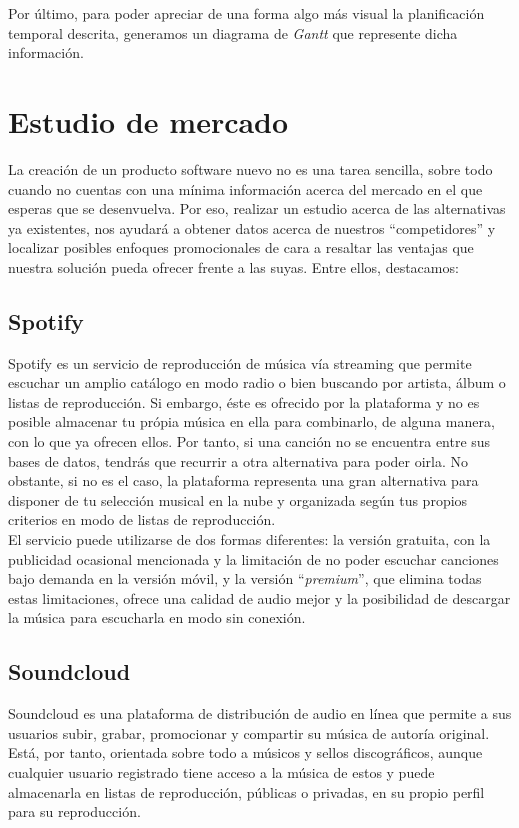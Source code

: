 Por último, para poder apreciar de una forma algo más visual la planificación temporal descrita, generamos un diagrama de \textit{Gantt} que represente dicha información.

\section{Estudio de mercado}

La creación de un producto software nuevo no es una tarea sencilla, sobre todo cuando no cuentas con una mínima información acerca del mercado en el que esperas que se desenvuelva. Por eso, realizar un estudio acerca de las alternativas ya existentes, nos ayudará a obtener datos acerca de nuestros ``competidores'' y localizar posibles enfoques promocionales de cara a resaltar las ventajas que nuestra solución pueda ofrecer frente a las suyas. Entre ellos, destacamos:

\subsection{Spotify \cite{Spotify}}
Spotify es un servicio de reproducción de música vía streaming que permite escuchar un amplio catálogo en modo radio o bien buscando por artista, álbum o listas de reproducción. Si embargo, éste es ofrecido por la plataforma y no es posible almacenar tu própia música en ella para combinarlo, de alguna manera, con lo que ya ofrecen ellos. Por tanto, si una canción no se encuentra entre sus bases de datos, tendrás que recurrir a otra alternativa para poder oirla. No obstante, si no es el caso, la plataforma representa una gran alternativa para disponer de tu selección musical en la nube y organizada según tus propios criterios en modo de listas de reproducción.\\

El servicio puede utilizarse de dos formas diferentes: la versión gratuita, con la publicidad ocasional mencionada y la limitación de no poder escuchar canciones bajo demanda en la versión móvil, y la versión ``\textit{premium}'', que elimina todas estas limitaciones, ofrece una calidad de audio mejor y la posibilidad de descargar la música para escucharla en modo sin conexión.

\subsection{Soundcloud \cite{Soundcloud}}
Soundcloud es una plataforma de distribución de audio en línea que permite a sus usuarios subir, grabar, promocionar y compartir su música de autoría original. Está, por tanto, orientada sobre todo a músicos y sellos discográficos, aunque cualquier usuario registrado tiene acceso a la música de estos y puede almacenarla en listas de reproducción, públicas o privadas, en su propio perfil para su reproducción.\\


